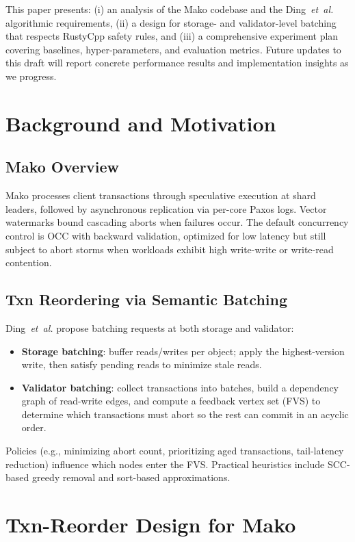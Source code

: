 \documentclass[letterpaper,twocolumn,10pt]{article}
\newcommand{\sysname}{Mako\xspace}
\begin{document}
This paper presents: (i) an analysis of the \sysname codebase and the Ding~\emph{et~al.} algorithmic requirements, (ii) a design for storage- and validator-level batching that respects RustyCpp safety rules, and (iii) a comprehensive experiment plan covering baselines, hyper-parameters, and evaluation metrics. Future updates to this draft will report concrete performance results and implementation insights as we progress.

\section{Background and Motivation}
\subsection{Mako Overview}
\sysname processes client transactions through speculative execution at shard leaders, followed by asynchronous replication via per-core Paxos logs. Vector watermarks bound cascading aborts when failures occur. The default concurrency control is OCC with backward validation, optimized for low latency but still subject to abort storms when workloads exhibit high write-write or write-read contention.

\subsection{Txn Reordering via Semantic Batching}
Ding~\emph{et~al.} propose batching requests at both storage and validator:
\begin{itemize}[leftmargin=*]
  \item \textbf{Storage batching}: buffer reads/writes per object; apply the highest-version write, then satisfy pending reads to minimize stale reads.
  \item \textbf{Validator batching}: collect transactions into batches, build a dependency graph of read-write edges, and compute a feedback vertex set (FVS) to determine which transactions must abort so the rest can commit in an acyclic order.
\end{itemize}
Policies (e.g., minimizing abort count, prioritizing aged transactions, tail-latency reduction) influence which nodes enter the FVS. Practical heuristics include SCC-based greedy removal and sort-based approximations.

\section{Txn-Reorder Design for Mako}
\end{document}
